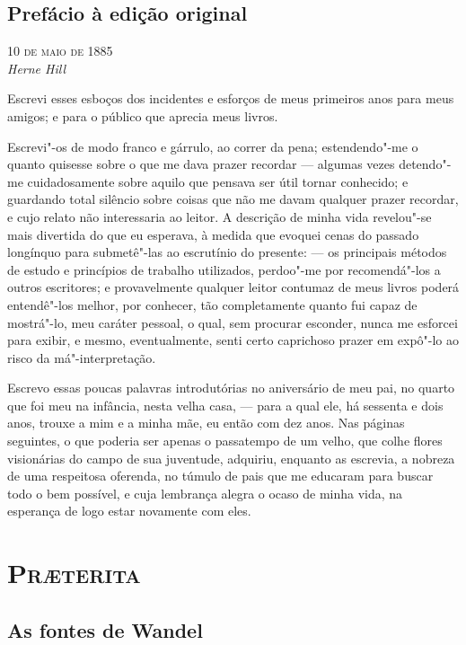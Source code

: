 \chapter{Prefácio à edição original}

\begin{flushright}
\textsc{10 de maio de 1885}\\
\textit{Herne Hill}
\end{flushright}

Escrevi esses esboços dos incidentes e esforços de meus primeiros anos
para meus amigos; e para o público que aprecia meus livros.

Escrevi"-os de modo franco e gárrulo, ao correr da pena; estendendo"-me o
quanto quisesse sobre o que me dava prazer recordar --- algumas vezes
detendo"-me cuidadosamente sobre aquilo que pensava ser útil tornar
conhecido; e guardando total silêncio sobre coisas que não me davam
qualquer prazer recordar, e cujo relato não interessaria ao leitor. A
descrição de minha vida revelou"-se mais divertida do que eu esperava, à
medida que evoquei cenas do passado longínquo para submetê"-las ao
escrutínio do presente: --- os principais métodos de estudo e princípios
de trabalho utilizados, perdoo"-me por recomendá"-los a outros escritores;
e provavelmente qualquer leitor contumaz de meus livros poderá
entendê"-los melhor, por conhecer, tão completamente quanto fui capaz de
mostrá"-lo, meu caráter pessoal, o qual, sem procurar esconder, nunca me
esforcei para exibir, e mesmo, eventualmente, senti certo caprichoso
prazer em expô"-lo ao risco da má"-interpretação.

Escrevo essas poucas palavras introdutórias no aniversário de meu pai,
no quarto que foi meu na infância, nesta velha casa, --- para a qual ele,
há sessenta e dois anos, trouxe a mim e a minha mãe, eu então com dez
anos. Nas páginas seguintes, o que poderia ser apenas o passatempo de um
velho, que colhe flores visionárias do campo de sua juventude, adquiriu,
enquanto as escrevia, a nobreza de uma respeitosa oferenda, no túmulo de
pais que me educaram para buscar todo o bem possível, e cuja lembrança
alegra o ocaso de minha vida, na esperança de logo estar novamente com
eles. 

\part{\textsc{Pr\ae terita}}

\chapter{As fontes de Wandel\footnotemark{}} %

